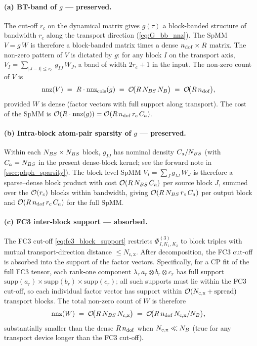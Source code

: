 \paragraph{(a) BT-band of $g$ — preserved.}
The cut-off $r_c$ on the dynamical matrix gives $g(\tau)$
a block-banded structure of bandwidth $r_c$ along the transport
direction (\cref{eq:G_bb_nnz}). The SpMM $V=g\,W$ is therefore a
block-banded matrix times a dense $n_{\mathrm{dof}}\times R$ matrix. The
non-zero pattern of $V$ is dictated by $g$: for any block $I$ on the
transport axis, $V_I = \sum_{|J-I|\le r_c}\,g_{IJ}\,W_J$, a band of
width $2r_c+1$ in the input. The non-zero count of $V$ is
\begin{equation}\label{eq:V_nnz}
  \mathrm{nnz}(V) \;=\; R\cdot\mathrm{nnz}_{\text{cols}}(g)
                 \;=\; \mathcal{O}\!\bigl(R\,N_{BS}\,N_{B}\bigr)
                 \;=\; \mathcal{O}\!\bigl(R\,n_{\mathrm{dof}}\bigr),
\end{equation}
provided $W$ is dense (factor vectors with full support along
transport). The cost of the SpMM is
$\mathcal{O}(R\cdot\mathrm{nnz}(g))=\mathcal{O}(R\,n_{\mathrm{dof}}\,r_c\,C_a)$.

\paragraph{(b) Intra-block atom-pair sparsity of $g$ — preserved.}
Within each $N_{BS}\times N_{BS}$ block, $g_{IJ}$ has nominal density
$C_a/N_{BS}$ (with $C_a=N_{BS}$ in the present dense-block kernel; see
the forward note in \cref{ssec:phph_sparsity}). The block-level SpMM
$V_I=\sum_J g_{IJ}\,W_J$ is therefore a sparse--dense block product
with cost
$\mathcal{O}(R\,N_{BS}\,C_a)$ per source block $J$, summed over the $\mathcal{O}(r_c)$
blocks within bandwidth, giving $\mathcal{O}(R\,N_{BS}\,r_c\,C_a)$ per output
block and $\mathcal{O}(R\,n_{\mathrm{dof}}\,r_c\,C_a)$ for the full SpMM.

\paragraph{(c) FC3 inter-block support — absorbed.}
The FC3 cut-off
\cref{eq:fc3_block_support} restricts $\Phi^{(3)}_{I,K_1,K_2}$ to
block triples with mutual transport-direction distance
$\le N_\mathrm{c,x}$. After decomposition, the FC3 cut-off is
absorbed into the support of the factor vectors. Specifically, for
a CP fit of the full FC3 tensor, each rank-one component
$\lambda_r\,a_r\otimes b_r\otimes c_r$ has full support
$\mathrm{supp}(a_r)\times\mathrm{supp}(b_r)\times\mathrm{supp}(c_r)$;
all such supports must lie within the FC3 cut-off, so each individual
factor vector has support within $\mathcal{O}(N_\mathrm{c,x}+\mathrm{spread})$
transport blocks. The total non-zero count of $W$ is therefore
\begin{equation}\label{eq:W_nnz}
  \mathrm{nnz}(W) \;=\; \mathcal{O}\!\bigl(R\,N_{BS}\,N_\mathrm{c,x}\bigr)
                 \;=\; \mathcal{O}\!\bigl(R\,n_{\mathrm{dof}}\,N_\mathrm{c,x}/N_{B}\bigr),
\end{equation}
substantially smaller than the dense $R\,n_{\mathrm{dof}}$ when
$N_\mathrm{c,x}\ll N_{B}$ (true for any transport device longer than
the FC3 cut-off).

